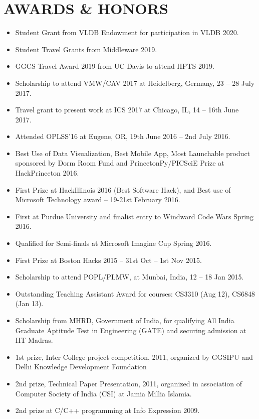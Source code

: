 \documentclass[10pt]{article}
\begin{document}
\section*{AWARDS \& HONORS}
\begin{itemize}
\itemsep-0.2em
\item Student Grant from VLDB Endowment for participation in VLDB 2020.
\item Student Travel Grants from Middleware 2019.
\item GGCS Travel Award 2019 from UC Davis to attend HPTS 2019.
\item Scholarship to attend VMW/CAV 2017 at Heidelberg, Germany, 23 -- 28 July 2017.
\item Travel grant to present work at ICS 2017 at Chicago, IL, 14 -- 16th June 2017. 
\item Attended OPLSS'16 at Eugene, OR, 19th June 2016 – 2nd July 2016.
\item Best Use of Data Visualization, Best Mobile App, Most Launchable product sponsored by Dorm Room Fund and PrincetonPy/PICSciE Prize at HackPrinceton 2016.
\item First Prize at HackIllinois 2016 (Best Software Hack), and 
Best use of Microsoft Technology award – 19-21st February 2016.
\item First at Purdue University and finalist entry to Windward Code Wars Spring 2016.
\item Qualified for Semi-finals at Microsoft Imagine Cup Spring 2016.
\item First Prize at Boston Hacks 2015 – 31st Oct – 1st Nov 2015.
\item Scholarship to attend POPL/PLMW, at Munbai, India, 12 -- 18 Jan 2015.
\item Outstanding Teaching Assistant Award for courses: CS3310 (Aug 12), CS6848 (Jan 13).
\item Scholarship from MHRD, Government of India, for qualifying All India Graduate
Aptitude Test in Engineering (GATE) and securing admission at IIT Madras.
\item 1st prize, Inter College project competition, 2011, organized by GGSIPU and Delhi
Knowledge Development Foundation
\item 2nd prize, Technical Paper Presentation, 2011, organized in association of Computer
Society of India (CSI) at Jamia Millia Islamia.
\item 2nd prize at C/C++ programming at Info Expression 2009.
\end{itemize}
\end{document}
